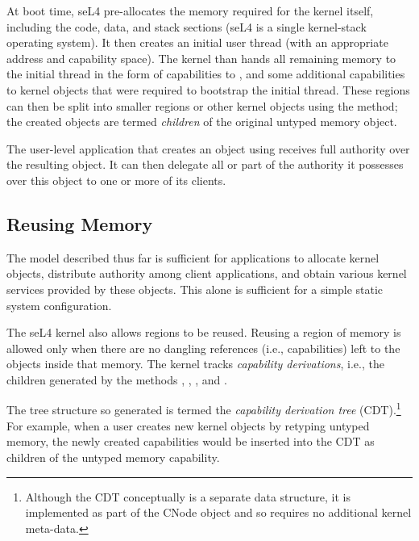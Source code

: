 At boot time, seL4 pre-allocates the memory required for the kernel
itself, including the code, data, and stack sections (seL4 is a single
kernel-stack operating system). It then creates an initial user
thread (with an appropriate address and capability space).
The kernel than hands all remaining memory to
the initial thread in the form of capabilities to , and
some additional capabilities to kernel objects that were required to
bootstrap the initial thread.  These  regions can then be split into
smaller regions or other kernel objects using the
 method; the created objects are termed \emph{children} of
the original untyped memory object.

The user-level application that creates an object using 
receives full authority over the resulting object. It can then delegate
all or part of the authority it possesses over this object to one or
more of its clients.

\subsection{Reusing Memory}
\label{s:memRevoke}

The model described thus far is sufficient for applications to
allocate kernel objects, distribute authority among client
applications, and obtain various kernel services provided by these
objects.  This alone is sufficient for a simple static system
configuration.

The seL4 kernel also allows  regions to be reused.
Reusing a region of memory is allowed only
when there are no dangling references (i.e., capabilities) left to the
objects inside that memory.  The kernel tracks
\emph{capability derivations}, i.e., the children generated by the
methods , , , and
.

The tree structure so generated is termed the \emph{capability
derivation tree} (CDT).\footnote{Although the CDT conceptually is a separate
data structure, it is implemented as part of the CNode object and so
requires no additional kernel meta-data.}  For example, when a user
creates new kernel objects by retyping untyped memory, the newly created
capabilities would be inserted into the CDT as children of the untyped
memory capability.

